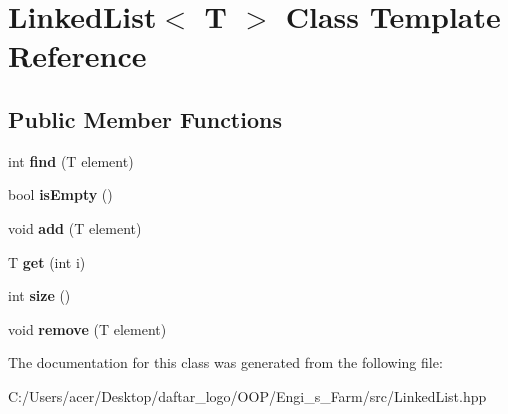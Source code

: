 \hypertarget{class_linked_list}{}\section{Linked\+List$<$ T $>$ Class Template Reference}
\label{class_linked_list}
\subsection*{Public Member Functions}
\begin{DoxyCompactItemize}
\item 
\mbox{\label{class_linked_list_a924e217dd525b84492e9f0dc61db96bc}} 
int {\bfseries find} (T element)
\item 
\mbox{\label{class_linked_list_a7ecbb28e82117a680839ed0dc28ebdce}} 
bool {\bfseries is\+Empty} ()
\item 
\mbox{\label{class_linked_list_ab7364799e5965dd59d4f5952cb953287}} 
void {\bfseries add} (T element)
\item 
\mbox{\label{class_linked_list_a76d26f9fc7b344dc1d5bb81b853ae96e}} 
T {\bfseries get} (int i)
\item 
\mbox{\label{class_linked_list_ab8388ea027c2de8125f5d1e5901c2b2e}} 
int {\bfseries size} ()
\item 
\mbox{\label{class_linked_list_a6c4973ae9956ddb037a9093cffa2adb1}} 
void {\bfseries remove} (T element)
\end{DoxyCompactItemize}


The documentation for this class was generated from the following file\+:\begin{DoxyCompactItemize}
\item 
C\+:/\+Users/acer/\+Desktop/daftar\+\_\+logo/\+O\+O\+P/\+Engi\+\_\+s\+\_\+\+Farm/src/Linked\+List.\+hpp\end{DoxyCompactItemize}
